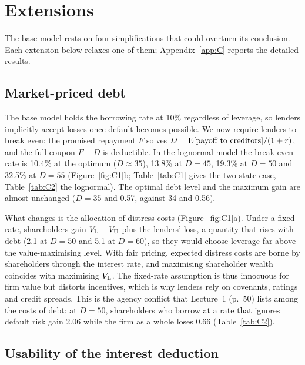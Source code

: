 \section{Extensions}\label{sec:ext}

The base model rests on four simplifications that could overturn its conclusion. Each extension below relaxes one of them; Appendix~\ref{app:C} reports the detailed results.

\subsection{Market-priced debt}\label{sec:mkt}

The base model holds the borrowing rate at 10\% regardless of leverage, so lenders implicitly accept losses once default becomes possible. We now require lenders to break even: the promised repayment $F$ solves $D = \mathrm{E}[\text{payoff to creditors}]/(1 + r)$, and the full coupon $F - D$ is deductible. In the lognormal model the break-even rate is 10.4\% at the optimum ($D \approx 35$), 13.8\% at $D = 45$, 19.3\% at $D = 50$ and 32.5\% at $D = 55$ (Figure~\ref{fig:C1}b; Table~\ref{tab:C1} gives the two-state case, Table~\ref{tab:C2} the lognormal). The optimal debt level and the maximum gain are almost unchanged ($D = 35$ and 0.57, against 34 and 0.56).

What changes is the allocation of distress costs (Figure~\ref{fig:C1}a). Under a fixed rate, shareholders gain $V_{\mathrm{L}} - V_{\mathrm{U}}$ plus the lenders' loss, a quantity that rises with debt (2.1 at $D = 50$ and 5.1 at $D = 60$), so they would choose leverage far above the value-maximising level. With fair pricing, expected distress costs are borne by shareholders through the interest rate, and maximising shareholder wealth coincides with maximising $V_{\mathrm{L}}$. The fixed-rate assumption is thus innocuous for firm value but distorts incentives, which is why lenders rely on covenants, ratings and credit spreads. This is the agency conflict that Lecture~1 (p.~50) lists among the costs of debt: at $D = 50$, shareholders who borrow at a rate that ignores default risk gain 2.06 while the firm as a whole loses 0.66 (Table~\ref{tab:C2}).

\subsection{Usability of the interest deduction}\label{sec:usable}

